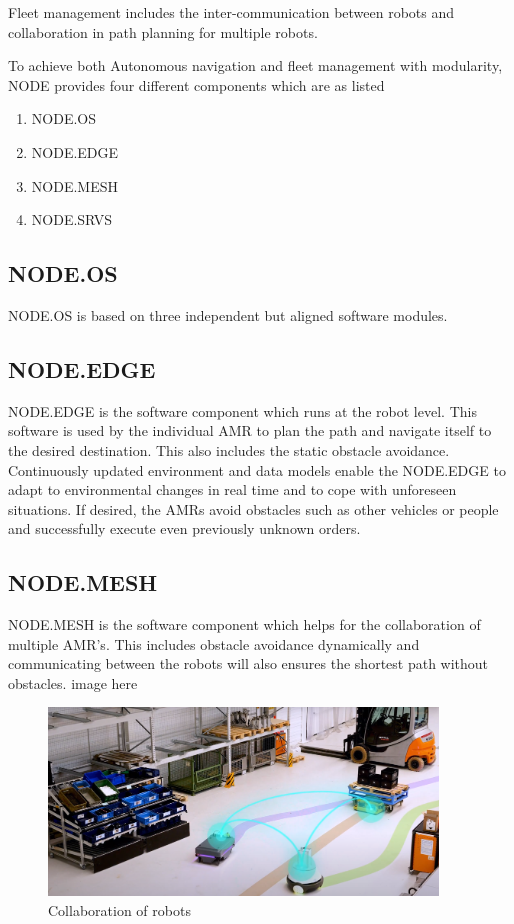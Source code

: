 Fleet management includes the inter-communication between robots and collaboration in path planning for multiple robots. 

To achieve both Autonomous navigation and fleet management with modularity, NODE provides four different components which are as listed
\begin{enumerate}
	\item NODE.OS
	\item NODE.EDGE
	\item NODE.MESH
	\item NODE.SRVS
\end{enumerate}

\subsection{NODE.OS}
NODE.OS is based on three independent but aligned software modules.
\subsection{NODE.EDGE}
NODE.EDGE is the software component which runs at the robot level. This software is used by the individual AMR to plan the path and navigate itself to the desired destination. This also includes the static obstacle avoidance. Continuously updated environment and data models enable the NODE.EDGE to adapt to environmental changes in real time and to cope with unforeseen situations. If desired, the AMRs avoid obstacles such as other vehicles or people and successfully execute even previously unknown orders.
\subsection{NODE.MESH}
NODE.MESH is the software component which helps for the collaboration of multiple AMR's. This includes obstacle avoidance dynamically and communicating between the robots will also ensures the shortest path without obstacles.
image here

\begin{figure}[h]
	\begin{center}
		\includegraphics[height=5cm]{images/mesh.png}
		\caption{Collaboration of robots}
	\end{center}
\end{figure}
